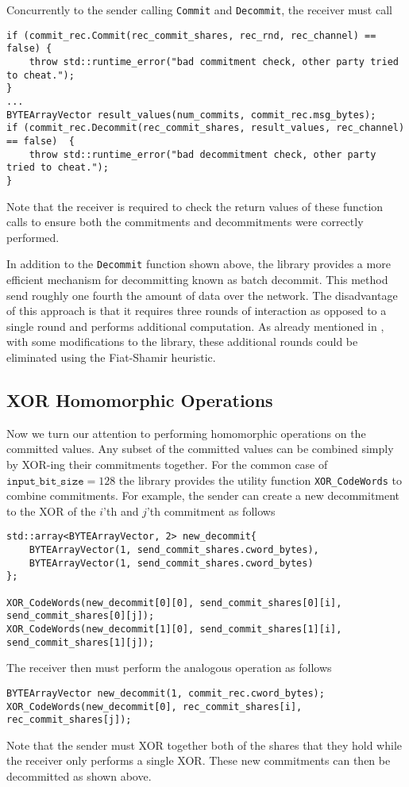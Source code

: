 Concurrently to the sender calling \texttt{Commit} and \texttt{Decommit}, the receiver must call 
\begin{lstlisting}     
if (commit_rec.Commit(rec_commit_shares, rec_rnd, rec_channel) == false) {
	throw std::runtime_error("bad commitment check, other party tried to cheat.");
}
...
BYTEArrayVector result_values(num_commits, commit_rec.msg_bytes);
if (commit_rec.Decommit(rec_commit_shares, result_values, rec_channel) == false)  {
	throw std::runtime_error("bad decommitment check, other party tried to cheat.");
}
\end{lstlisting}
Note that the receiver is required to check the return values of these function calls to ensure both the commitments and decommitments were correctly performed.

In addition to the \texttt{Decommit} function shown above, the library provides a more efficient mechanism for decommitting known as batch decommit. This method send roughly one fourth the amount of data over the network. The disadvantage of this approach is that it requires three rounds of interaction as opposed to a single round and performs additional computation. As already mentioned in , with some modifications to the library, these additional rounds could be eliminated using the Fiat-Shamir heuristic.

\subsection{XOR Homomorphic Operations}


Now we turn our attention to performing homomorphic operations on the committed values. Any subset of the committed values can be combined simply by XOR-ing their commitments together. For the common case of $\texttt{input\_bit\_size} =128$ the library provides the utility function \texttt{XOR\_CodeWords} to combine commitments. For example, the sender can create a new decommitment to the XOR of the $i$'th and $j$'th  commitment as follows
\begin{lstlisting}     
std::array<BYTEArrayVector, 2> new_decommit{
	BYTEArrayVector(1, send_commit_shares.cword_bytes),
	BYTEArrayVector(1, send_commit_shares.cword_bytes)
};

XOR_CodeWords(new_decommit[0][0], send_commit_shares[0][i], send_commit_shares[0][j]);
XOR_CodeWords(new_decommit[1][0], send_commit_shares[1][i], send_commit_shares[1][j]);
\end{lstlisting}
The receiver then must perform the analogous operation as follows
\begin{lstlisting}     
BYTEArrayVector new_decommit(1, commit_rec.cword_bytes);
XOR_CodeWords(new_decommit[0], rec_commit_shares[i], rec_commit_shares[j]);
\end{lstlisting}
Note that the sender must XOR together both of the shares that they hold while the receiver only performs a single XOR. These new commitments can then be decommitted as shown above.


